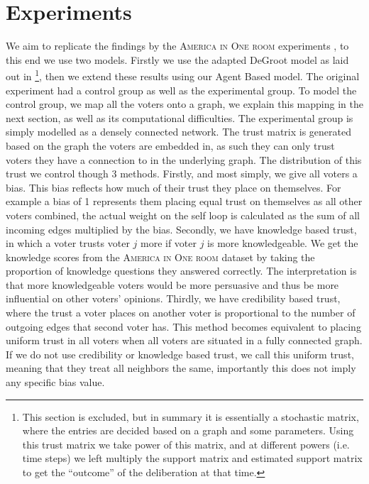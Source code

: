 \section{Experiments} We aim to replicate the findings by the \textsc{America
in One room} experiments \cite{fishkinCanDeliberationHave2024}, to this end we
use two models. Firstly we use the adapted DeGroot model as laid out in
\footnote{This section is excluded, but in summary it is
	essentially a stochastic matrix, where the entries are decided based on
	a graph and some parameters. Using this trust matrix we take power of
	this matrix, and at different powers (i.e. time steps) we left multiply
the support matrix and estimated support matrix to get the ``outcome'' of the
deliberation at that time.}, then we extend these results using our Agent Based
model. The original experiment had a control group as well as the experimental
group. To model the control group, we map all the voters onto a graph, we
explain this mapping in the next section, as well as its computational
difficulties. The experimental group is simply modelled as a densely connected
network. The trust matrix is generated based on the graph the voters are
embedded in, as such they can only trust voters they have a connection to in
the underlying graph. The distribution of this trust we control though 3
methods. Firstly, and most simply, we give all voters a bias. This bias
reflects how much of their trust they place on themselves. For example a bias
of 1 represents them placing equal trust on themselves as all other voters
combined, the actual weight on the self loop is calculated as the sum of all
incoming edges multiplied by the bias. Secondly, we have knowledge based trust,
in which a voter trusts voter $j$ more if voter $j$ is more knowledgeable. We get
the knowledge scores from the \textsc{America in One room} dataset by taking the proportion of knowledge questions they answered correctly. The
interpretation is that more knowledgeable voters would be more persuasive and
thus be more influential on other voters' opinions. Thirdly, we have
credibility based trust, where the trust a voter places on another voter is
proportional to the number of outgoing edges that second voter has. This method
becomes equivalent to placing uniform trust in all voters when all voters are
situated in a fully connected graph. If we do not use credibility or knowledge
based trust, we call this uniform trust, meaning that they treat all neighbors
the same, importantly this does not imply any specific bias value.

